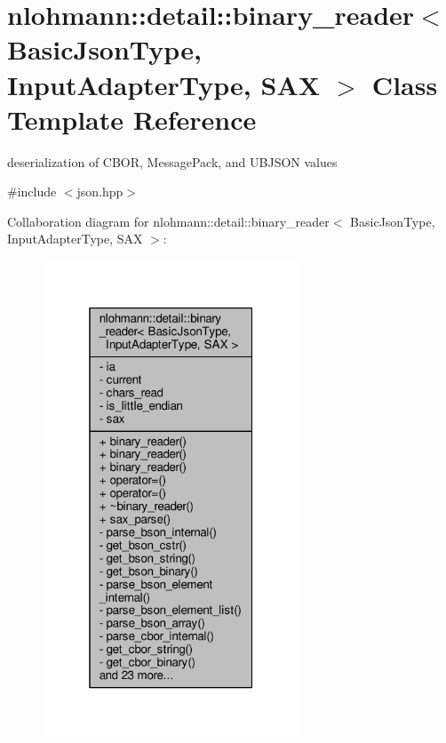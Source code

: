 \hypertarget{classnlohmann_1_1detail_1_1binary__reader}{}\section{nlohmann\+:\+:detail\+:\+:binary\+\_\+reader$<$ Basic\+Json\+Type, Input\+Adapter\+Type, S\+AX $>$ Class Template Reference}
\label{classnlohmann_1_1detail_1_1binary__reader}


deserialization of C\+B\+OR, Message\+Pack, and U\+B\+J\+S\+ON values  




{\ttfamily \#include $<$json.\+hpp$>$}



Collaboration diagram for nlohmann\+:\+:detail\+:\+:binary\+\_\+reader$<$ Basic\+Json\+Type, Input\+Adapter\+Type, S\+AX $>$\+:
\nopagebreak
\begin{figure}[H]
\begin{center}
\leavevmode
\includegraphics[width=217pt]{classnlohmann_1_1detail_1_1binary__reader__coll__graph}
\end{center}
\end{figure}
